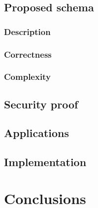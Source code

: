 \documentclass[12pt]{article}
\newcommand\blankpage{%
    \null
    \thispagestyle{empty}%
    \addtocounter{page}{-1}%
    \newpage}
\begin{document}
\subsection{Proposed schema}

\subsubsection{Description}
\subsubsection{Correctness}
\subsubsection{Complexity}

\subsection{Security proof}

\subsection{Applications}

\subsection{Implementation}

\section{Conclusions}

\pagebreak

\blankpage
\end{document}
